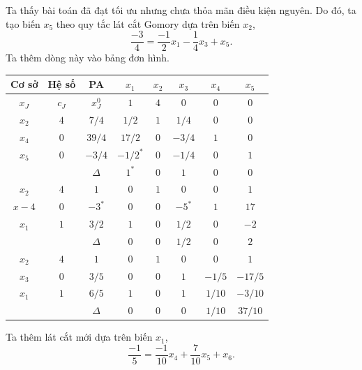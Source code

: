 \documentclass[12pt,a4paper]{report}
\begin{document}
    Ta thấy bài toán đã đạt tối ưu nhưng chưa thỏa mãn điều kiện nguyên. Do đó, ta tạo biến $x_5$ theo quy tắc lát cắt Gomory dựa trên biến $x_2$, $$\dfrac{-3}{4}= \dfrac{-1}{2}x_1 -\dfrac{1}{4}x_3 +x_5.$$ Ta thêm dòng này vào bảng đơn hình.\\
    \begin{center}
        \begin{tabular}{|c|c|c|c|c|c|c|c|}
        \hline
         Cơ sở & Hệ số & PA& $x_1$ &$x_2$ &$ x_3$ &$x_4$ &$x_5$\\
        \hline
        $x_J$ &$c_J$ &$x_J^0$ &$1$ &$4$ &$0$ &$0$ &$0$\\
        \hline
        $x_2$ &$4$ &$7/4$ &$1/2$ &$1$ &$1/4$ &$0$ &$0$\\
        $x_4$ &$0$ &$39/4$ &$17/2$ &$0$ &$-3/4$ &$1$ &$0$\\
        $x_5$ &$0$ &$-3/4$ &$-1/2^*$ &$0$ &$-1/4$ &$0$ &$1$\\
        \hline
        && $\Delta$ &$1^* $ &$0$ &$1$ &$0$ &$0$\\
        \hline
        $x_2$ &$ 4$ &$1$ &$0$ &$1$ &$0$ &$0$ &$1$\\
        $x-4$ &$0$ &$-3^*$ &$0$ &$0$ &$-5^*$ &$1$ &$17$\\
        $x_1$ & $1$ &$3/2$ &$1$ &$0$ &$1/2$&$0$ &$-2$\\
        \hline
        && $\Delta$ &$0$ &$0$ &$1/2$ &$0$ &$2$\\
        \hline
        $x_2$ &$4$ &$1$ &$0$ &$1$ &$0$ &$0$ &$1$\\
        $x_3$ &$0$ &$3/5$ &$0$ &$0$ &$1$ &$-1/5$ &$-17/5$\\
        $x_1$ &$1$ &$6/5$ &$1$ &$0$ &$1$ &$1/10$&$-3/10$\\
        \hline
        && $\Delta$ &$0$ &$0$ &$0$ &$1/10$ &$37/10$\\
        \hline
        
        \end{tabular}
    \end{center}
    Ta thêm lát cắt mới dựa trên biến $x_1$, 
     $$\dfrac{-1}{5}= \dfrac{-1}{10}x_4 +\dfrac{7}{10}x_5+x_6.$$
\end{document}
